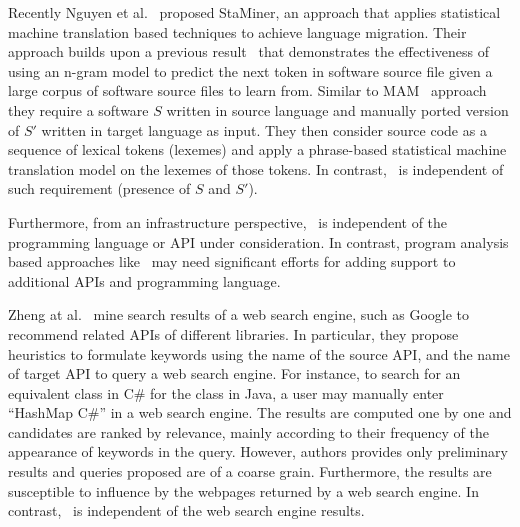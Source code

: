 Recently Nguyen et al.~\cite{nguyen2014migrating,nguyen2014statistical} proposed StaMiner,
an approach that applies statistical machine translation based techniques to achieve language migration.
Their approach builds upon a previous result~\cite{hindle2012naturalness} that demonstrates the effectiveness of using
an n-gram model to predict the next token in software source file
given a large corpus of software source files to learn from.
Similar to MAM~\cite{Zhong2010ICSE} approach they
require a software $S$ written in source language and manually ported version of $S'$ written in target language as input. 
They then consider source code as a sequence of lexical tokens (lexemes) and
apply a phrase-based statistical machine translation model on the lexemes of those tokens.
In contrast, \tool\ is independent of such requirement (presence of $S$ and $S'$).


Furthermore, from an infrastructure perspective, \tool\ is independent of the programming language or API under consideration. In contrast, program analysis based approaches like~\cite{Zhong2010ICSE,Gokhale2013ICSE,nguyen2014statistical} may need significant
efforts for adding support to additional APIs and programming language.

Zheng at al.~\cite{Zheng2011FSE} mine search results of a web search engine,
such as Google to recommend related APIs of different libraries. 
In particular, they propose heuristics to formulate keywords using the
name of the source API, and the name of target API to query a web search engine.
For instance, to search for an equivalent class in C\# for the  class in Java,
a user may manually enter ``HashMap C\#'' in a web search engine.
The results are computed one by one and candidates are ranked by relevance,
mainly according to their frequency of the appearance of keywords in the query.
However, authors provides only preliminary results and queries proposed are of a coarse grain. 
Furthermore, the results are susceptible to influence by the webpages returned by a web search engine.
In contrast, \tool\ is independent of the web search engine results. %





